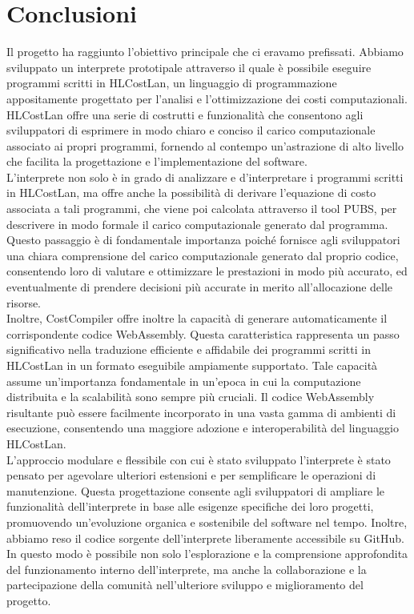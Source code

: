 \documentclass[../../main.tex]{subfiles}
\begin{document}
\chapter{Conclusioni}
Il progetto ha raggiunto l'obiettivo principale che ci eravamo prefissati. Abbiamo sviluppato un interprete prototipale attraverso il quale è possibile eseguire programmi scritti in HLCostLan, un linguaggio di programmazione appositamente progettato per l'analisi e l'ottimizzazione dei costi computazionali. HLCostLan offre una serie di costrutti e funzionalità che consentono agli sviluppatori di esprimere in modo chiaro e conciso il carico computazionale associato ai propri programmi, fornendo al contempo un'astrazione di alto livello che facilita la progettazione e l'implementazione del software.\\
L'interprete non solo è in grado di analizzare e d'interpretare i programmi scritti in HLCostLan, ma offre anche la possibilità di derivare l'equazione di costo associata a tali programmi, che viene poi calcolata attraverso il tool PUBS, per descrivere in modo formale il carico computazionale generato dal programma. Questo passaggio è di fondamentale importanza poiché fornisce agli sviluppatori una chiara comprensione del carico computazionale generato dal proprio codice, consentendo loro di valutare e ottimizzare le prestazioni in modo più accurato, ed eventualmente di prendere decisioni più accurate in merito all'allocazione delle risorse.\\
Inoltre, CostCompiler offre inoltre la capacità di generare automaticamente il corrispondente codice WebAssembly. Questa caratteristica rappresenta un passo significativo nella traduzione efficiente e affidabile dei programmi scritti in HLCostLan in un formato eseguibile ampiamente supportato. Tale capacità assume un'importanza fondamentale in un'epoca in cui la computazione distribuita e la scalabilità sono sempre più cruciali. Il codice WebAssembly risultante può essere facilmente incorporato in una vasta gamma di ambienti di esecuzione, consentendo una maggiore adozione e interoperabilità del linguaggio HLCostLan.\\
L'approccio modulare e flessibile con cui è stato sviluppato l'interprete è stato pensato per agevolare ulteriori estensioni e per semplificare le operazioni di manutenzione. Questa progettazione consente agli sviluppatori di ampliare le funzionalità dell'interprete in base alle esigenze specifiche dei loro progetti, promuovendo un'evoluzione organica e sostenibile del software nel tempo. Inoltre, abbiamo reso il codice sorgente dell'interprete liberamente accessibile su GitHub. In questo modo è possibile non solo l'esplorazione e la comprensione approfondita del funzionamento interno dell'interprete, ma anche la collaborazione e la partecipazione della comunità nell'ulteriore sviluppo e miglioramento del progetto.\\
\end{document}

